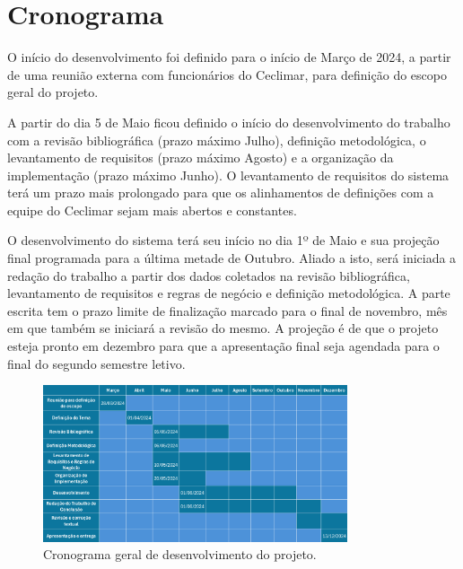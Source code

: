 \chapter{Cronograma}\label{cronograma}

O início do desenvolvimento foi definido para o início de Março de 2024, a partir de uma reunião externa com funcionários do Ceclimar, para definição do escopo geral do projeto.

A partir do dia 5 de Maio ficou definido o início do desenvolvimento do trabalho com a revisão bibliográfica (prazo máximo Julho), definição metodológica, o levantamento de requisitos (prazo máximo Agosto) e a organização da implementação (prazo máximo Junho). O levantamento de requisitos do sistema terá um prazo mais prolongado para que os alinhamentos de definições com a equipe do Ceclimar sejam mais abertos e constantes.

O desenvolvimento do sistema terá seu início no dia 1º de Maio e sua projeção final programada para a última metade de Outubro. Aliado a isto, será iniciada a redação do trabalho a partir dos dados coletados na revisão bibliográfica, levantamento de requisitos e regras de negócio e definição metodológica. A parte escrita tem o prazo limite de finalização marcado para o final de novembro, mês em que também se iniciará a revisão do mesmo. A projeção é de que o projeto esteja pronto em dezembro para que a apresentação final seja agendada para o final do segundo semestre letivo.

\begin{figure}[htb]
  \centering
  \includegraphics[width=0.8\textwidth]{imagens/cronograma1.png}
  \caption{Cronograma geral de desenvolvimento do projeto.}
  \label{fig:cronograma}
\end{figure}